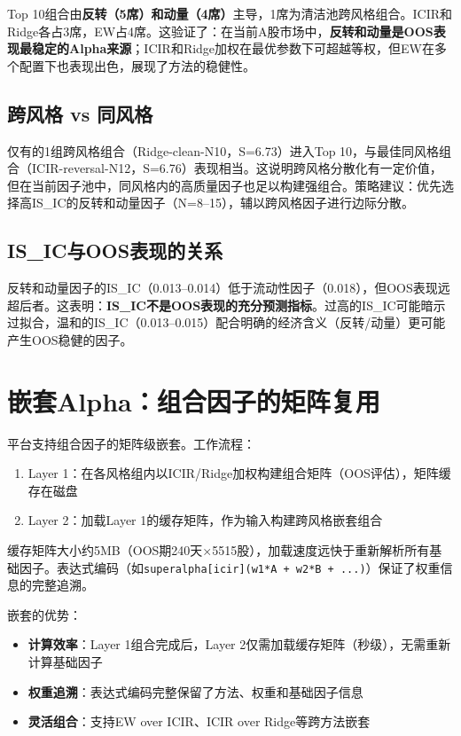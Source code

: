 \documentclass[11pt,a4paper]{ctexart}
\begin{document}
Top 10组合由\textbf{反转（5席）和动量（4席）}主导，1席为清洁池跨风格组合。ICIR和Ridge各占3席，EW占4席。这验证了：在当前A股市场中，\textbf{反转和动量是OOS表现最稳定的Alpha来源}；ICIR和Ridge加权在最优参数下可超越等权，但EW在多个配置下也表现出色，展现了方法的稳健性。

\subsection{跨风格 vs 同风格}

仅有的1组跨风格组合（Ridge-clean-N10，S=6.73）进入Top 10，与最佳同风格组合（ICIR-reversal-N12，S=6.76）表现相当。这说明跨风格分散化有一定价值，但在当前因子池中，同风格内的高质量因子也足以构建强组合。策略建议：优先选择高IS\_IC的反转和动量因子（N=8--15），辅以跨风格因子进行边际分散。

\subsection{IS\_IC与OOS表现的关系}

反转和动量因子的IS\_IC（0.013--0.014）低于流动性因子（0.018），但OOS表现远超后者。这表明：\textbf{IS\_IC不是OOS表现的充分预测指标}。过高的IS\_IC可能暗示过拟合，温和的IS\_IC（0.013--0.015）配合明确的经济含义（反转/动量）更可能产生OOS稳健的因子。

\section{嵌套Alpha：组合因子的矩阵复用}

平台支持组合因子的矩阵级嵌套。工作流程：

\begin{enumerate}[nosep]
    \item Layer 1：在各风格组内以ICIR/Ridge加权构建组合矩阵（OOS评估），矩阵缓存在磁盘
    \item Layer 2：加载Layer 1的缓存矩阵，作为输入构建跨风格嵌套组合
\end{enumerate}

缓存矩阵大小约5MB（OOS期240天×5515股），加载速度远快于重新解析所有基础因子。表达式编码（如\texttt{superalpha[icir](w1*A + w2*B + ...)}）保证了权重信息的完整追溯。

嵌套的优势：
\begin{itemize}[nosep]
    \item \textbf{计算效率}：Layer 1组合完成后，Layer 2仅需加载缓存矩阵（秒级），无需重新计算基础因子
    \item \textbf{权重追溯}：表达式编码完整保留了方法、权重和基础因子信息
    \item \textbf{灵活组合}：支持EW over ICIR、ICIR over Ridge等跨方法嵌套
\end{itemize}
\end{document}
